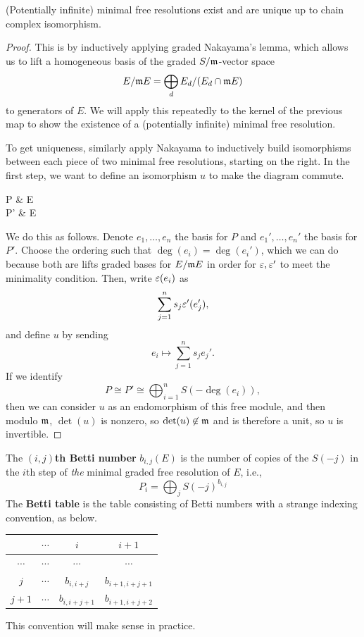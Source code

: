 \documentclass[12pt]{article}
\begin{document}
\begin{prop}
    (Potentially infinite) minimal free resolutions exist and are unique up to chain complex isomorphism.
\end{prop}

\begin{proof}
    This is by inductively applying graded Nakayama's lemma, which allows us to lift a homogeneous basis of the graded $S/\mathfrak{m}$-vector space
    \[E/\mathfrak{m} E = \bigoplus_d E_d/(E_d \cap \mathfrak{m} E)\]
    to generators of $E$. We will apply this repeatedly to the kernel of the previous map to show the existence of a (potentially infinite) minimal free resolution.

    To get uniqueness, similarly apply Nakayama to inductively build isomorphisms between each piece of two minimal free resolutions, starting on the right. In the first step, we want to define an isomorphism $u$ to make the diagram commute.
    \begin{cd}
        P \rar["\eps"] \dar[dashed,"u"] & E \dar["\id"]\\
        P' \rar["\eps'"] & E
    \end{cd}
    We do this as follows. Denote $e_1,\dots,e_n$ the basis for $P$ and $e_1',\dots,e_n'$ the basis for $P'$. Choose the ordering such that $\deg(e_i)=\deg(e_i')$, which we can do because both are lifts graded bases for $E/\mathfrak{m} E$ in order for $\varepsilon,\varepsilon'$ to meet the minimality condition. Then, write $\varepsilon(e_i)$ as
    \[\sum_{j=1}^n s_j \varepsilon'(e_j'),\]
    and define $u$ by sending
    \[e_i \mapsto \sum_{j=1}^n s_j e_j'.\]
    If we identify
    \[P\cong P' \cong \bigoplus_{i=1}^n S(-\deg(e_i)),\]
    then we can consider $u$ as an endomorphism of this free module, and then modulo $\mathfrak{m}$, $\det(u)$ is nonzero, so $\det(u)\not\in \mathfrak{m}$ and is therefore a unit, so $u$ is invertible.
\end{proof}

\begin{defn}
    The \textbf{$(i,j)$th Betti number} $b_{i,j}(E)$ is the number of copies of the $S(-j)$ in the $i$th step of \textit{the} minimal graded free resolution of $E$, i.e.,
    \[P_i = \bigoplus_j S(-j)^{b_{i,j}}\]
    The \textbf{Betti table} is the table consisting of Betti numbers with a strange indexing convention, as below.
    \begin{center}
    \begin{tabular}{c|c c c}
                 & $\cdots$      & $i$      & $i+1$ \\\hline
        $\cdots$ & $\cdots$ & $\cdots$      & $\cdots$ \\
        $j$      & $\cdots$ & $b_{i,i+j}$   & $b_{i+1,i+j+1}$\\
        $j+1$    & $\cdots$ & $b_{i,i+j+1}$ & $b_{i+1,i+j+2}$
    \end{tabular}
    \end{center}
    This convention will make sense in practice.
\end{defn}
\end{document}
